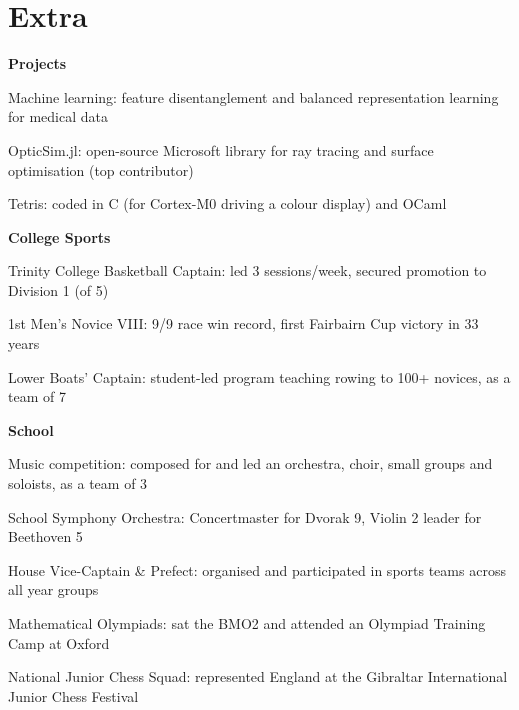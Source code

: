 \documentclass[letterpaper, 10pt]{article}
\begin{document}
\section*{Extra}
\textbf{Projects}
\begin{compact}
	\item Machine learning: feature disentanglement and balanced representation learning for medical data \hfill \href{https://github.com/alfredclwong/ite-feature-selection}{\faGithub}
	\item OpticSim.jl: open-source Microsoft library for ray tracing and surface optimisation (top contributor) \hfill \href{https://github.com/microsoft/OpticSim.jl}{\faGithub}
	\item Tetris: coded in C (for Cortex-M0 driving a colour display) and OCaml \hfill \href{https://github.com/alfredclwong/4b25-tetris}{\faGithub} \href{https://github.com/alfredclwong/tetris-ocaml}{\faGithub}
\end{compact}
\vspace{.5\baselineskip}
\textbf{College Sports}
\begin{compact}
	\item Trinity College Basketball Captain: led 3 sessions/week, secured promotion to Division 1 (of 5)
	\item 1st Men's Novice VIII: 9/9 race win record, first Fairbairn Cup victory in 33 years
	\item Lower Boats' Captain: student-led program teaching rowing to 100+ novices, as a team of 7
\end{compact}
\vspace{.5\baselineskip}
\textbf{School}
\begin{compact}
	\item Music competition: composed for and led an orchestra, choir, small groups and soloists, as a team of 3
	\item School Symphony Orchestra: Concertmaster for Dvorak 9, Violin 2 leader for Beethoven 5
	\item House Vice-Captain \& Prefect: organised and participated in sports teams across all year groups
	\item Mathematical Olympiads: sat the BMO2 and attended an Olympiad Training Camp at Oxford
	\item National Junior Chess Squad: represented England at the Gibraltar International Junior Chess Festival
\end{compact}

\end{document}
